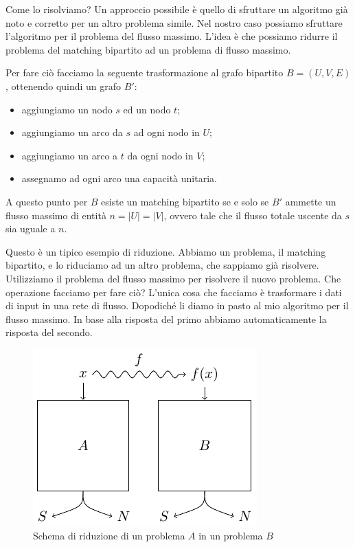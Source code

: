 Come lo risolviamo? Un approccio possibile è quello di sfruttare un algoritmo già noto e corretto
per un altro problema simile. Nel nostro caso possiamo sfruttare l'algoritmo per il problema del
flusso massimo. L'idea è che possiamo ridurre il problema del matching bipartito ad un problema di
flusso massimo.

Per fare ciò facciamo la seguente trasformazione al grafo bipartito $B = (U,V,E)$, ottenendo quindi un grafo
$B'$:
\begin{itemize}
    \item aggiungiamo un nodo $s$ ed un nodo $t$;
    \item aggiungiamo un arco da $s$ ad ogni nodo in $U$;
    \item aggiungiamo un arco a $t$ da ogni nodo in $V$;
    \item assegnamo ad ogni arco una capacità unitaria.
\end{itemize}

A questo punto per $B$ esiste un matching bipartito se e solo se $B'$ ammette un flusso massimo di
entità $n = |U| = |V|$, ovvero tale che il flusso totale uscente da $s$ sia uguale a $n$.

Questo è un tipico esempio di riduzione. Abbiamo un problema, il matching bipartito, e lo riduciamo
ad un altro problema, che sappiamo già risolvere. Utilizziamo il problema del flusso massimo per risolvere
il nuovo problema. Che operazione facciamo per fare ciò? L'unica cosa che facciamo è trasformare
i dati di input in una rete di flusso. Dopodiché li diamo in pasto al mio algoritmo per il flusso
massimo.  In base alla risposta del primo abbiamo automaticamente la risposta del secondo.

\begin{figure}[h]
    \begin{center}
        \includegraphics{img/Reducibility.pdf}
    \end{center}
    \caption{Schema di riduzione di un problema $A$ in un problema $B$}
\end{figure}


